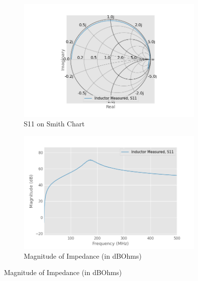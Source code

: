 \documentclass{article}
\begin{document}
\begin{figure}[h]
    \centering
    \begin{subfigure}{0.5\linewidth}
        \includegraphics[width=\linewidth]{./pics/inductor_meas_smith.png}
        \caption{S11 on Smith Chart}
    \end{subfigure}%
    \begin{subfigure}{0.5\linewidth}
        \includegraphics[width=\linewidth]{./pics/inductor_meas_db.png}
        \caption{Magnitude of Impedance (in dBOhms)}
    \end{subfigure}


\end{figure}
\end{document}
